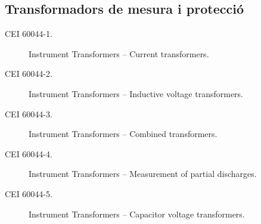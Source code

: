 \subsection*{Transformadors de mesura i protecció}
\begin{description}
    \item [\hspace{5mm}CEI 60044-1.] Instrument Transformers -- Current transformers.
    \item [\hspace{5mm}CEI 60044-2.] Instrument Transformers -- Inductive voltage transformers.
    \item [\hspace{5mm}CEI 60044-3.] Instrument Transformers -- Combined transformers.
    \item [\hspace{5mm}CEI 60044-4.] Instrument Transformers -- Measurement of partial discharges.
    \item [\hspace{5mm}CEI 60044-5.] Instrument Transformers -- Capacitor voltage transformers.
\end{description}


